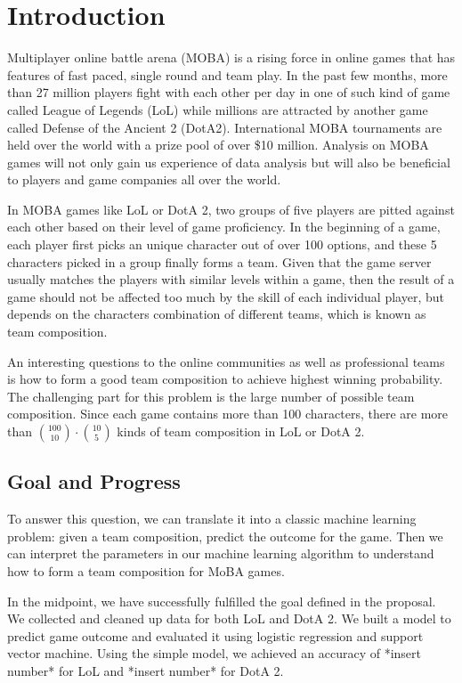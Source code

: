 \documentclass[conference]{IEEEtran}
\begin{document}
\section{Introduction}

Multiplayer online battle arena (MOBA) is a rising force in online games that has features of fast paced, single round and team play. In the past few months, more than 27 million players fight with each other per day in one of such kind of game called League of Legends (LoL)\cite{Ian} while millions are attracted by another game called Defense of the Ancient 2 (DotA2). International MOBA tournaments are held over the world with a prize pool of over \$10 million\cite{Valve}.  Analysis on MOBA games will not only gain us experience of data analysis but will also be beneficial to players and game companies all over the world.

In MOBA games like LoL or DotA 2, two groups of five players are pitted against each other based on their level of game proficiency. In the beginning of a game, each player first picks an unique character out of over 100 options, and these 5 characters picked in a group finally forms a team. Given that the game server usually matches the players with similar levels within a game, then the result of a game should not be affected too much by the skill of each individual player, but depends on the characters combination of different teams, which is known as team composition. 

An interesting questions to the online communities as well as professional teams is how to form a good team composition to achieve highest winning probability. The challenging part for this problem is the large number of possible team composition. Since each game contains more than 100 characters, there are more than $\binom{100}{10}\cdot\binom{10}{5}$ kinds of team composition in LoL or DotA 2.


\subsection{Goal and Progress}

To answer this question, we can translate it into a classic machine learning problem: given a team composition, predict the outcome for the game. Then we can interpret the parameters in our machine learning algorithm to understand how to form a team composition for MoBA games.
 
In the midpoint, we have successfully fulfilled the goal defined in the proposal. 
We collected and cleaned up data for both LoL and DotA 2.
We built a model to predict game outcome and evaluated it using logistic regression and support vector machine. 
Using the simple model, we achieved an accuracy of *insert number* for LoL and *insert number* for DotA 2.
\end{document}
